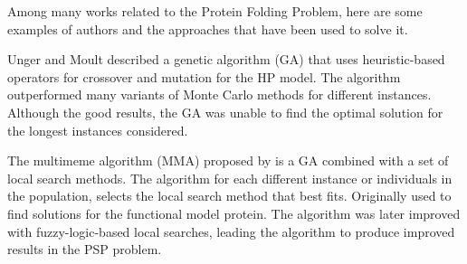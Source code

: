 Among many works related to the Protein Folding Problem, here are some examples of authors and the approaches that have been used to solve it.










Unger and Moult \cite{unger1993genetic} described a genetic algorithm (GA) that uses heuristic-based operators for crossover and mutation for the HP model. The algorithm outperformed many variants of Monte Carlo methods for different instances. Although the good results, the GA was unable to find the optimal solution for the longest instances considered.


The multimeme algorithm (MMA) proposed by \cite{krasnogor2002multimeme} is a GA combined with a set of local search methods. The algorithm for each different instance or individuals in the population, selects the local search method that best fits. Originally used to find solutions for the functional model protein. The algorithm was later improved with fuzzy-logic-based local searches, leading the algorithm to produce improved results in the PSP problem.


